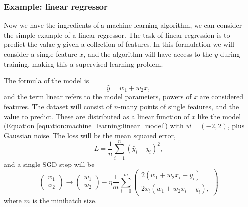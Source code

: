 \subsubsection{Example: linear regressor}
Now we have the ingredients of a machine learning algorithm, we can consider the simple example of a linear regressor. 
The task of linear regression is to predict the value $y$ given a collection of features. In this formulation we will consider a single feature $x$, and the algorithm will have access to the $y$ during training, making this a supervised learning problem. 

The formula of the model is
\begin{equation}
    \hat{y} = w_{1} + w_{2}x,
    \label{equation:machine_learning:linear_model}
\end{equation}
and the term linear refers to the model parameters, powers of $x$ are considered features. 
The dataset will consist of $n$-many points of single features, and the value to predict. 
These are distributed as a linear function of $x$ like the model (Equation \ref{equation:machine_learning:linear_model}) with $\vec{w} = (-2,2)$, plus Gaussian noise.
The loss will be the mean squared error,
\begin{equation}
    L = \frac{1}{n}\sum_{i=1}^{n}(\hat{y}_{i}-y_{i})^{2},
\end{equation} 
and a single SGD step will be 
\begin{equation}
    \begin{pmatrix}
        w_{1} \\
        w_{2}
    \end{pmatrix} \rightarrow
    \begin{pmatrix}
        w_{1} \\
        w_{2}
    \end{pmatrix} - \eta
    \frac{1}{m}\sum_{i=0}^{m}
    \begin{pmatrix}
        2(w_{1}+w_{2}x_{i} - y_{i})\\
        2x_{i}(w_{1}+w_{2}x_{i} - y_{i}),
    \end{pmatrix}
\end{equation}
where $m$ is the minibatch size.


